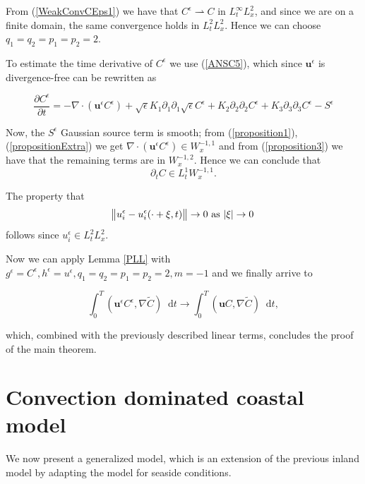 \documentclass[11pt]{article}
\newcommand*\diff{\mathop{}\!\mathrm{d}}
\begin{document}
     From (\ref{WeakConvCEps1}) we have that $C^\epsilon \rightharpoonup C$ in $L_t^\infty L_x^2$, and since we are on a finite domain, the same convergence holds in $L_t^2 L_x^2.$ Hence we can choose $q_1 = q_2 = p_1 = p_2 = 2.$
     
     To estimate the time derivative of $C^\epsilon$ we use (\ref{ANSC5}), which since $\mathbf{u}^\epsilon$ is divergence-free can be rewritten as
     
         \[  \frac{\partial C^\epsilon}{\partial t} = - \nabla \cdot (\mathbf{u}^\epsilon C^\epsilon) + \sqrt{\epsilon} K_1 \partial_1 \partial_1 \sqrt{\epsilon} C^\epsilon + K_2 \partial_2 \partial_2 C^\epsilon + K_3 \partial_3 \partial_3 C^\epsilon -S^\epsilon \]
         
         Now, the $S^\epsilon$ Gaussian source term is smooth; from (\ref{proposition1}), (\ref{propositionExtra}) we get $ \nabla \cdot (\mathbf{u}^\epsilon C^\epsilon) \in W_x^{-1,1}$ and from (\ref{proposition3}) we have that the remaining terms are in $W_x^{-1,2}.$ Hence we can conclude that $$\partial_t C \in L_t^1 W_x^{-1,1}.$$
         
      The property that $$\norm{u_i^\epsilon - u_i^\epsilon(\cdot + \xi, t)} \to 0 \text{ as } \abs{\xi} \to 0$$ follows since $u_i^\epsilon \in L^2_t L^2_x.$
      
      Now we can apply Lemma \ref{PLL} with $g^\epsilon = C^\epsilon, h^\epsilon = u^\epsilon, q_1 = q_2 = p_1 = p_2 = 2, m=-1$ and we finally arrive to
   
   \[ \int_0^T (\mathbf{u}^\epsilon C^\epsilon, \nabla \tilde{C}) \diff t \to \int_0^T (\mathbf{u} C, \nabla \tilde{C}) \diff t,\]
   
   which, combined with the previously described linear terms, concludes the proof of the main theorem.


\section{Convection dominated coastal model} \label{convdomcoastal}

We now present a generalized model, which is an extension of the previous inland model by adapting the model for seaside conditions.

\begin{figure}[!h]
\centering
{}
\end{figure}
\end{document}
